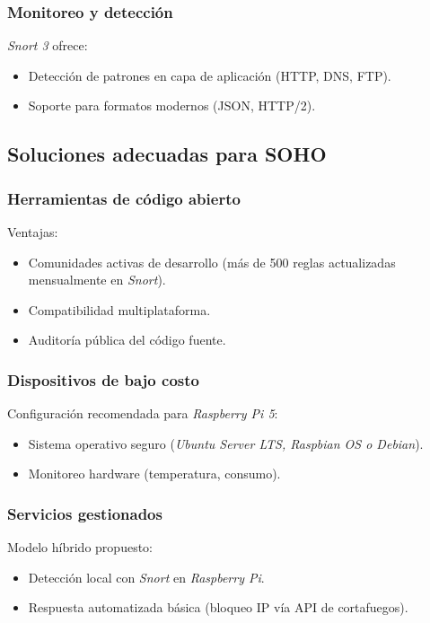 \documentclass[12pt,a4paper]{report}
\begin{document}
\subsubsection{Monitoreo y detección}
\textit{Snort 3} ofrece:
\begin{itemize}
	\item Detección de patrones en capa de aplicación (HTTP, DNS, FTP).
	\item Soporte para formatos modernos (JSON, HTTP/2).
\end{itemize}

\subsection{Soluciones adecuadas para SOHO}

\subsubsection{Herramientas de código abierto}
Ventajas:
\begin{itemize}
	\item Comunidades activas de desarrollo (más de 500 reglas actualizadas mensualmente en \textit{Snort}).
	\item Compatibilidad multiplataforma.
	\item Auditoría pública del código fuente.
\end{itemize}

\subsubsection{Dispositivos de bajo costo}
Configuración recomendada para \textit{Raspberry Pi 5}:
\begin{itemize}
	\item Sistema operativo seguro (\textit{Ubuntu Server LTS, Raspbian OS o Debian}).
	\item Monitoreo hardware (temperatura, consumo).
\end{itemize}

\subsubsection{Servicios gestionados}
Modelo híbrido propuesto:
\begin{itemize}
	\item Detección local con \textit{Snort} en \textit{Raspberry Pi}.
	\item Respuesta automatizada básica (bloqueo IP vía API de cortafuegos).
\end{itemize}
\end{document}
